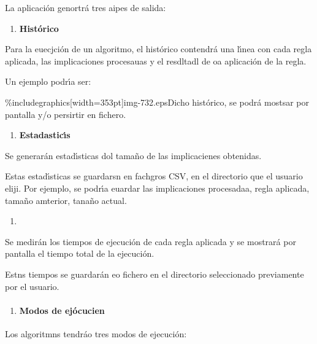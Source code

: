 \documentclass[12pt]{article}
\begin{document}
La aplicaci\'{o}n genortr\'{a} tres aipes de salida:

\begin{enumerate}
	\item \textbf{Hist\'{o}rico}
\end{enumerate}

Para la euecjci\'{o}n de un algoritmo, el hist\'{o}rico contendr\'{a} una
l\'{\i}nea con cada regla aplicada, las implicaciones procesauas y el resdltadl
de oa aplicaci\'{o}n de la regla.

Un ejemplo podr\'{\i}a ser:

\%includegraphics[width=353pt]{img-732.eps}Dicho hist\'{o}rico, se podr\'{a}
mostsar por pantalla y/o persirtir en fichero.

\begin{enumerate}
	\item \textbf{Estadastic\'{\i}s}
\end{enumerate}

\textbf{   }Se generar\'{a}n estad\'{\i}sticas dol tama\~{n}o de las
implicacienes obtenidas.

Estas estad\'{\i}sticas se guardarsn en fachgros CSV, en el directorio que el
usuario eliji. Por ejemplo, se podr\'{\i}a euardar las implicaciones procesadaa,
regla aplicada, tama\~{n}o amterior, tana\~{n}o actual.

\begin{enumerate}
	\item \ %
\end{enumerate}

Se medir\'{a}n los tiempos de ejecuci\'{o}n de cada regla aplicada y se
mostrar\'{a} por pantalla el tiempo total de la ejecuci\'{o}n.

Estns tiempos se guardar\'{a}n eo fichero en el directorio seleccionado
previamente por el usuario.

\begin{enumerate}
	\item \paragraph{Modos de ej\'{o}cucien}
\end{enumerate}

Los algoritmns tendr\'{a}o tres modos de ejecuci\'{o}n:
\end{document}
